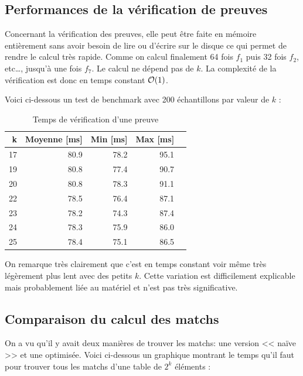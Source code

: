 \subsection{Performances de la vérification de preuves}

Concernant la vérification des preuves, elle peut être faite en mémoire entièrement sans avoir besoin de lire ou d'écrire sur le disque ce qui permet de rendre le calcul très rapide. Comme on calcul finalement 64 fois $f_1$ puis 32 fois $f_2$, etc\dots, jusqu'à une fois $f_7$. Le calcul ne dépend pas de $k$. La complexité de la vérification est donc en temps constant $\mathcal{O}(1)$.

Voici ci-dessous un test de benchmark avec 200 échantillons par valeur de $k$ :

\begin{table}[H]
  \centering
  \begin{tabular}{rrrrr}
    \textbf{k} & \textbf{Moyenne [ms]} & \textbf{Min [ms]} & \textbf{Max [ms]} \\
    \hline
    \hline
    17 & 80.9 & 78.2 & 95.1 \\
    \hline
    19 & 80.8 & 77.4 & 90.7 \\
    \hline
    20 & 80.8 & 78.3 & 91.1 \\
    \hline
    22 & 78.5 & 76.4 & 87.1 \\
    \hline
    23 & 78.2 & 74.3 & 87.4 \\
    \hline
    24 & 78.3 & 75.9 & 86.0 \\
    \hline
    25 & 78.4 & 75.1 & 86.5
  \end{tabular}
  \caption{Temps de vérification d'une preuve}
\end{table}

On remarque très clairement que c'est en temps constant voir même très légèrement plus lent avec des petits $k$. Cette variation est difficilement explicable mais probablement liée au matériel et n'est pas très significative. 

\newpage
\subsection{Comparaison du calcul des matchs}

On a vu qu'il y avait deux manières de trouver les matchs: une version << naïve >> et une optimisée. Voici ci-dessous un graphique montrant le temps qu'il faut pour trouver tous les matchs d'une table de $2^k$ éléments :

